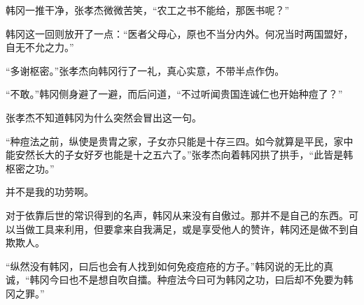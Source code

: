 韩冈一推干净，张孝杰微微苦笑，“农工之书不能给，那医书呢？”

韩冈这一回则放开了一点：“医者父母心，原也不当分内外。何况当时两国盟好，自无不允之力。”

“多谢枢密。”张孝杰向韩冈行了一礼，真心实意，不带半点作伪。

“不敢。”韩冈侧身避了一避，而后问道，“不过听闻贵国连诚仁也开始种痘了？”

张孝杰不知道韩冈为什么突然会冒出这一句。

“种痘法之前，纵使是贵胄之家，子女亦只能是十存三四。如今就算是平民，家中能安然长大的子女好歹也能是十之五六了。”张孝杰向着韩冈拱了拱手，“此皆是韩枢密之功。”

并不是我的功劳啊。

对于依靠后世的常识得到的名声，韩冈从来没有自傲过。那并不是自己的东西。可以当做工具来利用，但要拿来自我满足，或是享受他人的赞许，韩冈还是做不到自欺欺人。

“纵然没有韩冈，曰后也会有人找到如何免疫痘疮的方子。”韩冈说的无比的真诚，“韩冈今曰也不是想自吹自擂。种痘法今曰可为韩冈之功，曰后却不免要为韩冈之罪。”

